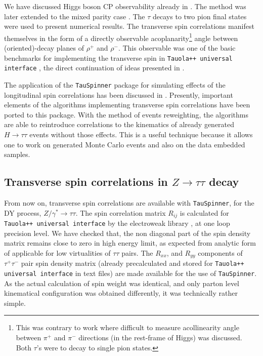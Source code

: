 \documentclass[12pt]{article}
\begin{document}
We have discussed Higgs boson CP  observability 
already  in \cite{Bower:2002zx}. The method was later extended to the mixed parity case \cite{Desch:2003rw}. 
The $\tau$ decays to two pion final states were used to present numerical results.
The transverse spin correlations
manifest themselves in the form of a directly
observable acoplanarity\footnote{
This was contrary to  work \cite{Kramer:1994jn}
where difficult to measure acollinearity  angle between $\pi^+$ and $\pi^-$ directions (in the rest-frame of Higgs)
was discussed. Both $\tau$'s were to decay to single pion states.}  angle between (oriented)-decay planes of $\rho^+$ and $\rho^-$. %
This observable was one of the  basic benchmarks for  implementing  the transverse spin
in   {\tt Tauola++ universal interface}  \cite{Davidson:2010rw}, the 
direct continuation of ideas presented in \cite{Golonka:2003xt}.

The application of the {\tt TauSpinner} package for simulating effects of the longitudinal spin correlations 
has been discussed in \cite{TauSpinner2014}. Presently, important elements of the algorithms implementing transverse  
spin correlations have  been ported  to this package. With the method of events reweighting, 
the algorithms are able to reintroduce
correlations to the kinematics of already generated  $H \to \tau \tau$ events without those effects. 
This is a useful technique because it allows one to work on  generated Monte Carlo events and also on 
the data embedded samples. 

\subsection{Transverse spin correlations in  $Z \to \tau \tau$ decay}
From now on, transverse spin correlations are available with {\tt TauSpinner}, for the  DY process, $Z/\gamma^* \to \tau\tau$. 
The spin correlation matrix $R_{ij}$ is calculated for {\tt Tauola++ universal interface} by the electroweak library 
\cite{Andonov:2008ga}, at one loop precision level. 
We have checked that,  
the  non diagonal part  of the spin density matrix remains close to zero 
in high energy limit, as expected from analytic form of \cite{jadach-was:1984} applicable for low virtualities of $\tau\tau$ pairs. 
The  $R_{xx}$, and $ R_{yy}$ components of $\tau^+ \tau^-$ pair spin density matrix (already 
precalculated and stored for {\tt Tauola++ universal interface} in text files)  are made available for the
use of {\tt TauSpinner}.  As the actual calculation of spin weight was identical, and only parton level kinematical 
configuration was obtained differently, it was technically rather simple. 
\end{document}
